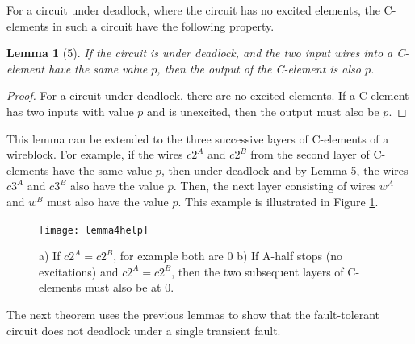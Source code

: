 \documentclass[12pt]{report}
\newtheorem*{corollary}{Corollary}
\newtheorem*{lemma}{Lemma}
\begin{document}
For a circuit under deadlock, where the circuit has no excited elements, the C-elements in such a circuit have the following property.
\begin{lemma}[5]
If the circuit is under deadlock, and the two input wires into a C-element have the same value $p$, then the output of the C-element is also $p$.
\end{lemma}
\begin{proof}
For a circuit under deadlock, there are no excited elements.  If a C-element has two inputs with value $p$ and is unexcited, then the output must also be $p$.
\end{proof}
This lemma can be extended to the three successive layers of C-elements of a wireblock.  For example, if the wires $c2^A$ and $c2^B$ from the second layer of C-elements have the same value $p$, then under deadlock and by Lemma 5, the wires $c3^A$ and $c3^B$ also have the value $p$.  Then, the next layer consisting of wires $w^A$ and $w^B$ must also have the value $p$.  This example is illustrated in Figure \ref{fig:t2}.

\begin{figure}
\centering
\texttt{[image: lemma4help]}
\caption[C-element under deadlock]{a) If $c2^A=c2^B$, for example both are 0 b) If A-half stops (no excitations) and $c2^A=c2^B$, then the two subsequent layers of C-elements must also be at 0. }
\label{fig:t2}
\end{figure}


The next theorem uses the previous lemmas to show that the fault-tolerant circuit does not deadlock under a single transient fault.
\end{document}
